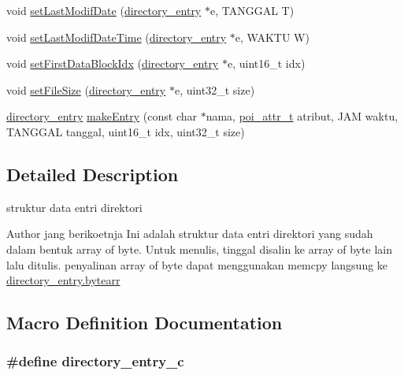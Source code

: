 \begin{DoxyCompactItemize}
\item 
void \hyperlink{directory-entry_8c_a0d6184c06efca3bd8ee3e3314de4013d}{set\-Last\-Modif\-Date} (\hyperlink{structdirectory__entry}{directory\-\_\-entry} $\ast$e, T\-A\-N\-G\-G\-A\-L T)
\item 
void \hyperlink{directory-entry_8c_afa6f9ebace0db1160a2b1b53dcf6bff0}{set\-Last\-Modif\-Date\-Time} (\hyperlink{structdirectory__entry}{directory\-\_\-entry} $\ast$e, W\-A\-K\-T\-U W)
\item 
void \hyperlink{directory-entry_8c_a4275d4bb22d8095e6319637119694d9a}{set\-First\-Data\-Block\-Idx} (\hyperlink{structdirectory__entry}{directory\-\_\-entry} $\ast$e, uint16\-\_\-t idx)
\item 
void \hyperlink{directory-entry_8c_a602a8f906599cd997e73640df620a514}{set\-File\-Size} (\hyperlink{structdirectory__entry}{directory\-\_\-entry} $\ast$e, uint32\-\_\-t size)
\item 
\hyperlink{structdirectory__entry}{directory\-\_\-entry} \hyperlink{directory-entry_8c_a9316a7dff46a87f98e3471031896670f}{make\-Entry} (const char $\ast$nama, \hyperlink{structpoi__attr__t}{poi\-\_\-attr\-\_\-t} atribut, J\-A\-M waktu, T\-A\-N\-G\-G\-A\-L tanggal, uint16\-\_\-t idx, uint32\-\_\-t size)
\end{DoxyCompactItemize}


\subsection{Detailed Description}
struktur data entri direktori \begin{DoxyAuthor}{Author}
jang berikoetnja Ini adalah struktur data entri direktori yang sudah dalam bentuk array of byte. Untuk menulis, tinggal disalin ke array of byte lain lalu ditulis. penyalinan array of byte dapat menggunakan memcpy langsung ke \hyperlink{structdirectory__entry_a380aef5511e7e06c9677a3ef970b32bc}{directory\-\_\-entry.\-bytearr} 
\end{DoxyAuthor}


\subsection{Macro Definition Documentation}
\hypertarget{directory-entry_8c_a4cfbd0d55293ca255d9a15bad4e9e0fd}{
\subsubsection[{directory\-\_\-entry\-\_\-c}]{\setlength{\rightskip}{0pt plus 5cm}\#define directory\-\_\-entry\-\_\-c}}\label{directory-entry_8c_a4cfbd0d55293ca255d9a15bad4e9e0fd}


